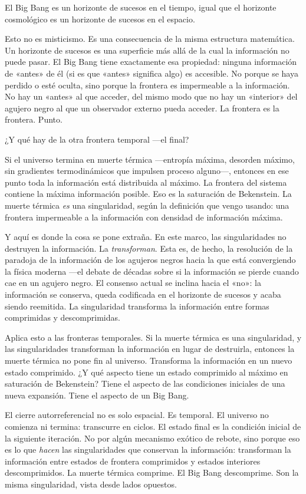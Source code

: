 \documentclass[11pt, twoside, openright]{book}
\begin{document}
El Big Bang es un horizonte de sucesos en el tiempo, igual que el horizonte cosmológico es un horizonte de sucesos en el espacio.

Esto no es misticismo. Es una consecuencia de la misma estructura matemática. Un horizonte de sucesos es una superficie más allá de la cual la información no puede pasar. El Big Bang tiene exactamente esa propiedad: ninguna información de «antes» de él (si es que «antes» significa algo) es accesible. No porque se haya perdido o esté oculta, sino porque la frontera es impermeable a la información. No hay un «antes» al que acceder, del mismo modo que no hay un «interior» del agujero negro al que un observador externo pueda acceder. La frontera es la frontera. Punto.

¿Y qué hay de la otra frontera temporal ---el final?

Si el universo termina en muerte térmica ---entropía máxima, desorden máximo, sin gradientes termodinámicos que impulsen proceso alguno---, entonces en ese punto toda la información está distribuida al máximo. La frontera del sistema contiene la máxima información posible. Eso es la saturación de Bekenstein. La muerte térmica \textit{es} una singularidad, según la definición que vengo usando: una frontera impermeable a la información con densidad de información máxima.

Y aquí es donde la cosa se pone extraña. En este marco, las singularidades no destruyen la información. La \textit{transforman}. Esta es, de hecho, la resolución de la paradoja de la información de los agujeros negros hacia la que está convergiendo la física moderna ---el debate de décadas sobre si la información se pierde cuando cae en un agujero negro. El consenso actual se inclina hacia el «no»: la información se conserva, queda codificada en el horizonte de sucesos y acaba siendo reemitida. La singularidad transforma la información entre formas comprimidas y descomprimidas.

Aplica esto a las fronteras temporales. Si la muerte térmica es una singularidad, y las singularidades transforman la información en lugar de destruirla, entonces la muerte térmica no pone fin al universo. Transforma la información en un nuevo estado comprimido. ¿Y qué aspecto tiene un estado comprimido al máximo en saturación de Bekenstein? Tiene el aspecto de las condiciones iniciales de una nueva expansión. Tiene el aspecto de un Big Bang.

El cierre autorreferencial no es solo espacial. Es temporal. El universo no comienza ni termina: transcurre en ciclos. El estado final es la condición inicial de la siguiente iteración. No por algún mecanismo exótico de rebote, sino porque eso es lo que \textit{hacen} las singularidades que conservan la información: transforman la información entre estados de frontera comprimidos y estados interiores descomprimidos. La muerte térmica comprime. El Big Bang descomprime. Son la misma singularidad, vista desde lados opuestos.
\end{document}

